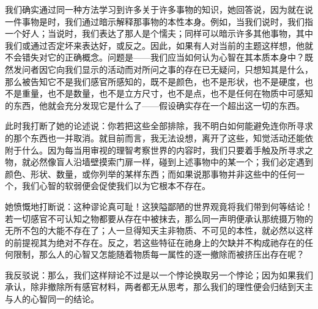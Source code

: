 我们确实通过同一种方法学习到许多关于许多事物的知识，她回答说，因为就在说一件事物是时，我们通过暗示解释那事物的本性本身。例如，当我们说时，我们指一个好人；当说时，我们表达了那人是个懦夫；同样可以暗示许多其他事物，其中我们或通过否定坏来表达好，或反之。因此，如果有人对当前的主题这样想，他就不会错失对它的正确概念。问题是——我们应当如何认为心智在其本质本身中？既然发问者因它向我们显示的活动而对所问之事的存在已无疑问，只想知其是什么，那么被告知它不是我们感官所感知的，既不是颜色，也不是形状，也不是硬度，也不是重量，也不是数量，也不是立方尺寸，也不是点，也不是任何在物质中可感知的东西，他就会充分发现它是什么了——假设确实存在一个超出这一切的东西。\par

此时我打断了她的论述说：你若把这些全部排除，我不明白如何能避免连你所寻求的那个东西也一并取消。就目前而言，我无法设想，离开了这些，知觉活动还能依附于什么。因为每当用审视的理智考察世界的内容时，我们只要着手触及所寻求之物，就必然像盲人沿墙壁摸索门扉一样，碰到上述事物中的某一个；我们必定遇到颜色、形状、数量，或你列举的某样东西；而如果说那事物并非这些中的任何一个，我们心智的软弱便会促使我们以为它根本不存在。\par

她愤慨地打断说：这种谬论真可耻！这狭隘鄙陋的世界观竟将我们带到何等结论！若一切感官不可认知之物都要从存在中被抹去，那么同一声明便承认那统摄万物的无所不包的大能不存在了；人一旦得知天主非物质、不可见的本性，就必然以这样的前提视其为绝对不存在。反之，若这些特征在祂身上的欠缺并不构成祂存在的任何限制，那么人的心智又怎能随着物质每一属性的逐一撤除而被挤压出存在呢？\par

我反驳说：那么，我们这样辩论不过是以一个悖论换取另一个悖论；因为如果我们承认，除非撤除所有感官材料，两者都无从思考，那么我们的理性便会归结到天主与人的心智同一的结论。\par

